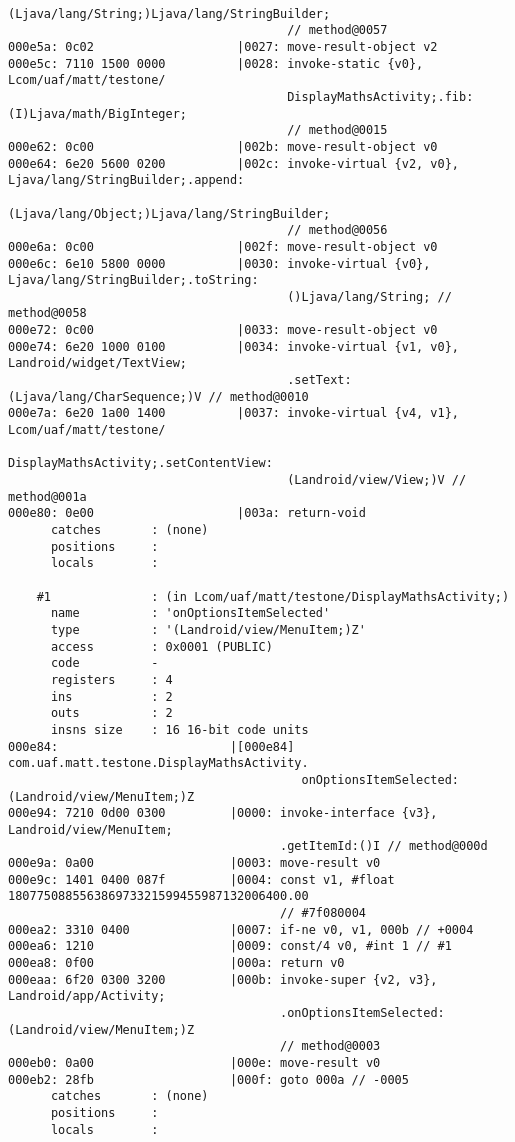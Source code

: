 \begin{lstlisting}
                                       (Ljava/lang/String;)Ljava/lang/StringBuilder;
                                       // method@0057
000e5a: 0c02                    |0027: move-result-object v2
000e5c: 7110 1500 0000          |0028: invoke-static {v0}, Lcom/uaf/matt/testone/
                                       DisplayMathsActivity;.fib:(I)Ljava/math/BigInteger;
                                       // method@0015
000e62: 0c00                    |002b: move-result-object v0
000e64: 6e20 5600 0200          |002c: invoke-virtual {v2, v0}, Ljava/lang/StringBuilder;.append:
                                       (Ljava/lang/Object;)Ljava/lang/StringBuilder;
                                       // method@0056
000e6a: 0c00                    |002f: move-result-object v0
000e6c: 6e10 5800 0000          |0030: invoke-virtual {v0}, Ljava/lang/StringBuilder;.toString:
                                       ()Ljava/lang/String; // method@0058
000e72: 0c00                    |0033: move-result-object v0
000e74: 6e20 1000 0100          |0034: invoke-virtual {v1, v0}, Landroid/widget/TextView;
                                       .setText:(Ljava/lang/CharSequence;)V // method@0010
000e7a: 6e20 1a00 1400          |0037: invoke-virtual {v4, v1}, Lcom/uaf/matt/testone/
                                       DisplayMathsActivity;.setContentView:
                                       (Landroid/view/View;)V // method@001a
000e80: 0e00                    |003a: return-void
      catches       : (none)
      positions     :
      locals        :

    #1              : (in Lcom/uaf/matt/testone/DisplayMathsActivity;)
      name          : 'onOptionsItemSelected'
      type          : '(Landroid/view/MenuItem;)Z'
      access        : 0x0001 (PUBLIC)
      code          -
      registers     : 4
      ins           : 2
      outs          : 2
      insns size    : 16 16-bit code units
000e84:                        |[000e84] com.uaf.matt.testone.DisplayMathsActivity.
                                         onOptionsItemSelected:(Landroid/view/MenuItem;)Z
000e94: 7210 0d00 0300         |0000: invoke-interface {v3}, Landroid/view/MenuItem;
                                      .getItemId:()I // method@000d
000e9a: 0a00                   |0003: move-result v0
000e9c: 1401 0400 087f         |0004: const v1, #float 180775088556386973321599455987132006400.00
                                      // #7f080004
000ea2: 3310 0400              |0007: if-ne v0, v1, 000b // +0004
000ea6: 1210                   |0009: const/4 v0, #int 1 // #1
000ea8: 0f00                   |000a: return v0
000eaa: 6f20 0300 3200         |000b: invoke-super {v2, v3}, Landroid/app/Activity;
                                      .onOptionsItemSelected:(Landroid/view/MenuItem;)Z
                                      // method@0003
000eb0: 0a00                   |000e: move-result v0
000eb2: 28fb                   |000f: goto 000a // -0005
      catches       : (none)
      positions     :
      locals        :


\end{lstlisting}
